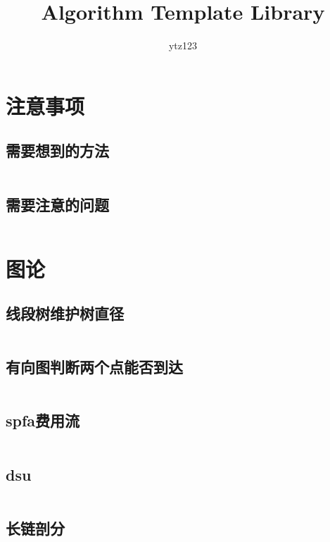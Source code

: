 \documentclass{article}
\author{ytz123}
\title{Algorithm Template Library}
\begin{document}
 
\maketitle %
\newpage %
\tableofcontents %

\newpage
\section{注意事项} %
\subsection{需要想到的方法} %
\inputminted[breaklines]{text}{../注意事项/需要想到的方法.txt}

\subsection{需要注意的问题} %
\inputminted[breaklines]{text}{../注意事项/需要注意的问题.txt}

\newpage
\section{图论} %
\subsection{线段树维护树直径} %
\inputminted[breaklines]{c++}{../图论/线段树维护树直径.cpp} %

\subsection{有向图判断两个点能否到达} %
\inputminted[breaklines]{c++}{../图论/有向图判断两个点能否到达.cpp} %

\subsection{spfa费用流} %
\inputminted[breaklines]{c++}{../图论/spfa费用流.cpp} %

\subsection{dsu} %
\inputminted[breaklines]{c++}{../图论/dsu.cpp} %

\subsection{长链剖分} %
\inputminted[breaklines]{c++}{../图论/长链剖分.cpp} %
\end{document}
